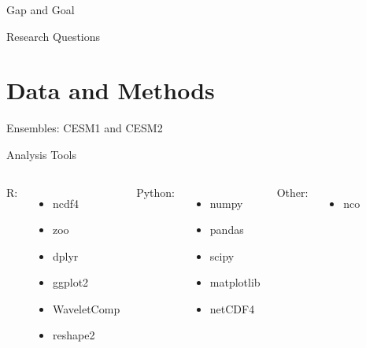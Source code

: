 \documentclass{beamer}
\begin{document}
\begin{frame}{Gap and Goal}

\end{frame}

\begin{frame}{Research Questions}

\end{frame}

\section{Data and Methods}

\begin{frame}{Ensembles: CESM1 and CESM2}

\end{frame}

\begin{frame}{Analysis Tools}
  \begin{columns}[t]
    R:
    \begin{itemize}
    \item ncdf4
    \item zoo
    \item dplyr
    \item ggplot2
    \item WaveletComp
    \item reshape2
    \end{itemize}
    Python:
    \begin{itemize}
    \item numpy
    \item pandas
    \item scipy
    \item matplotlib
    \item netCDF4
    \end{itemize}
    Other:
    \begin{itemize}
    \item nco
    \end{itemize}
  \end{columns}

\end{frame}
\end{document}
